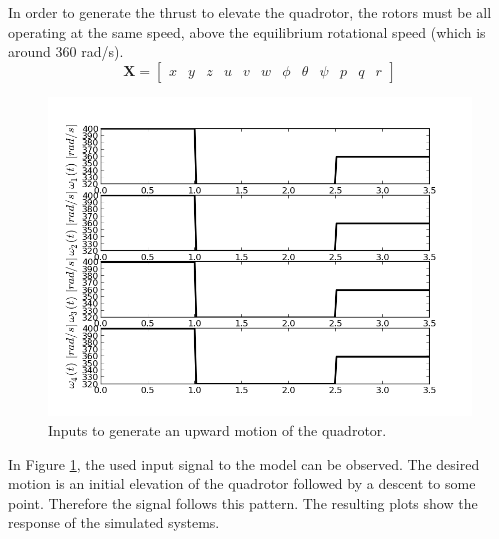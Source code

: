 In order to generate the thrust to elevate the quadrotor, the rotors must be all operating at the same speed, above the equilibrium rotational speed (which is around 360 rad/s). 
\begin{equation} \label{eq:statevector}
\mathbf{X} = \begin{bmatrix} x & y & z & u & v & w & \phi & \theta & \psi & p & q & r \end{bmatrix}
\end{equation} 
\begin{figure}[h!]
\centering
\includegraphics[scale=0.7]{Images/Chapter3/Constant_thrust_upwards/Inputs.png}
\caption{Inputs to generate an upward motion of the quadrotor.}
\label{fig:upwards_inputs}
\end{figure}

In Figure \ref{fig:upwards_inputs}, the used input signal to the model can be observed. The desired motion is an initial elevation of the quadrotor followed by a descent to some point. Therefore the signal follows this pattern. The resulting plots show the response of the simulated systems. \\

